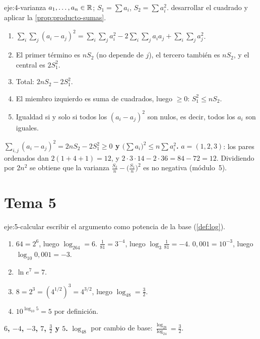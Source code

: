 \begin{solucion}{eje:4-varianza}
\datos $a_1,\dots,a_n\in\mathbb{R}$; $S_1=\sum a_i$, $S_2=\sum a_i^2$.
\planteamiento desarrollar el cuadrado y aplicar la \cref{prop:producto-sumas}.
\pasos
\begin{enumerate}[label=\arabic*.]
  \item $\sum_i\sum_j(a_i-a_j)^2=\sum_i\sum_ja_i^2-2\sum_i\sum_ja_ia_j+\sum_i\sum_ja_j^2$.
  \item El primer término es $nS_2$ (no depende de $j$), el tercero también es $nS_2$, y el central es $2S_1^2$.
  \item Total: $2nS_2-2S_1^2$.
  \item El miembro izquierdo es suma de cuadrados, luego $\ge0$: $S_1^2\le nS_2$.
  \item Igualdad si y solo si todos los $(a_i-a_j)^2$ son nulos, es decir, todos los $a_i$ son iguales.
\end{enumerate}
\resultado \textbf{$\sum_{i,j}(a_i-a_j)^2=2nS_2-2S_1^2\ge0$ y $\bigl(\sum a_i\bigr)^2\le n\sum a_i^2$.}
\comprobacion $a=(1,2,3)$: los pares ordenados dan $2(1+4+1)=12$, y $2\cdot3\cdot14-2\cdot36=84-72=12$. Dividiendo por $2n^2$ se obtiene que la varianza $\frac{S_2}n-\bigl(\frac{S_1}n\bigr)^2$ es no negativa (módulo~5).
\end{solucion}
\section{Tema 5}

\begin{solucion}{eje:5-calcular}
\planteamiento escribir el argumento como potencia de la base (\cref{def:log}).
\pasos
\begin{enumerate}[label=\arabic*.]
  \item $64=2^6$, luego $\log_264=6$. $\frac1{81}=3^{-4}$, luego $\log_3\frac1{81}=-4$. $0{,}001=10^{-3}$, luego $\log_{10}0{,}001=-3$.
  \item $\ln e^7=7$.
  \item $8=2^3=(4^{1/2})^3=4^{3/2}$, luego $\log_48=\frac32$.
  \item $10^{\log_{10}5}=5$ por definición.
\end{enumerate}
\resultado \textbf{$6$, $-4$, $-3$, $7$, $\frac32$ y $5$.}
\comprobacion $\log_48$ por cambio de base: $\frac{\log_28}{\log_24}=\frac32$.
\end{solucion}


